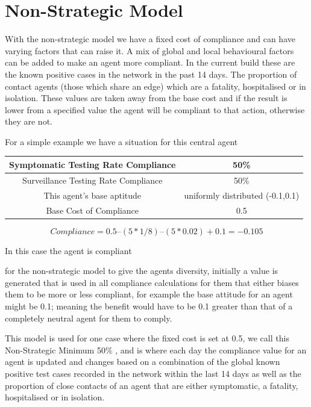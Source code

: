 \documentclass{article}
\begin{document}
\newpage

\section{Non-Strategic Model}
With the non-strategic model we have a fixed cost of compliance and can have varying factors that can raise it. A mix of global and local behavioural factors can be added to make an agent more compliant. In the current build these are the known positive cases in the network in the past 14 days. The proportion of contact agents (those which share an edge) which are a fatality, hospitalised or in isolation. These values are taken away from the base cost and if the result is lower from a specified value the agent will be compliant to that action, otherwise they are not.\newline

For a simple example we have a situation for this central agent\newline




\begin{tabular}{|c|c|}
\hline
Symptomatic Testing Rate Compliance & 50\% \\ \hline
Surveillance Testing Rate Compliance & 50\% \\ \hline
This agent’s base aptitude & uniformly distributed (-0.1,0.1) \\ \hline
Base Cost of Compliance & 0.5 \\ \hline
\end{tabular}



\[Compliance = 0.5 – (5 * 1/8) – (5*0.02) + 0.1 = -0.105\]\newline


In this case the agent is compliant

for the non-strategic model to give the agents diversity, initially a value is generated that is used in all compliance calculations for them that either biases them to be more or less compliant, for example the base attitude for an agent might be 0.1; meaning the benefit would have to be 0.1 greater than that of a completely neutral agent for them to comply.\newline

This model is used for one case where the fixed cost is set at 0.5, we call this Non-Strategic Minimum 50\% , and is where each day the compliance value for an agent is updated and changes based on a combination of the global known positive test cases recorded in the network within the last 14 days as well as the proportion of close contacts of an agent that are either symptomatic, a fatality, hospitalised or in isolation.\newline
\end{document}
